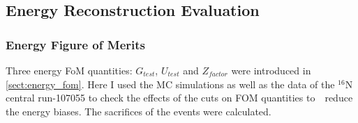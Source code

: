 
\subsection{Energy Reconstruction Evaluation}
\subsubsection{Energy Figure of Merits}\label{sect:energy_fomTest}
Three energy FoM quantities: $G_{test}$, $U_{test}$ and $Z_{factor}$ were introduced in \ref{sect:energy_fom}.
Here I used the MC simulations as well as the data of the $^{16}$N central run-107055 to check the effects of the cuts on FOM quantities to　reduce the energy biases. The sacrifices of the events were calculated. 


